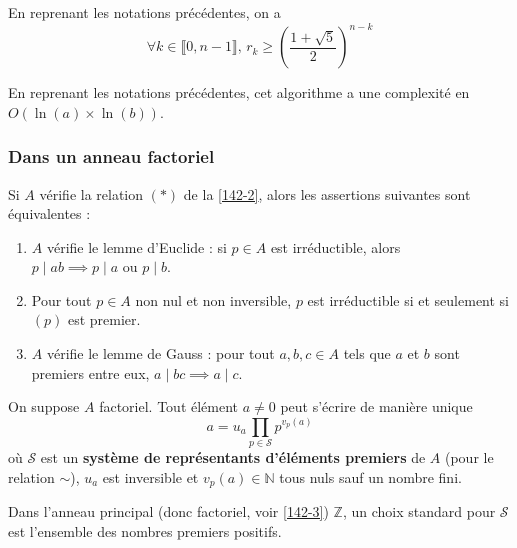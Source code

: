 
  \begin{proposition}
    En reprenant les notations précédentes, on a
    \[ \forall k \in \llbracket 0,n-1 \rrbracket, \, r_k \geq \left( \frac{1+\sqrt{5}}{2} \right)^{n-k} \]
  \end{proposition}

  \begin{corollary}
    En reprenant les notations précédentes, cet algorithme a une complexité en $O(\ln(a) \times \ln(b))$.
  \end{corollary}

  \subsubsection{Dans un anneau factoriel}


  \begin{proposition}
    Si $A$ vérifie la relation $(*)$ de la \cref{142-2}, alors les assertions suivantes sont équivalentes :
    \begin{enumerate}[label={\bfseries(\roman*)}]
      \item $A$ vérifie le lemme d'Euclide : si $p \in A$ est irréductible, alors $p \mid ab \implies p \mid a \text { ou } p \mid b$.
      \item Pour tout $p \in A$ non nul et non inversible, $p$ est irréductible si et seulement si $(p)$ est premier.
      \item $A$ vérifie le lemme de Gauss : pour tout $a, b, c \in A$ tels que $a$ et $b$ sont premiers entre eux, $a \mid bc \implies a \mid c$.
    \end{enumerate}
  \end{proposition}


  \begin{proposition}
    \label{142-2}
    On suppose $A$ factoriel. Tout élément $a \neq 0$ peut s'écrire de manière unique
    \[ a = u_a \prod_{p \in \mathcal{S}} p^{v_p(a)} \tag{$*$} \]
    où $\mathcal{S}$ est un \textbf{système de représentants d'éléments premiers} de $A$ (pour le relation $\sim$), $u_a$ est inversible et $v_p(a) \in \mathbb{N}$ tous nuls sauf un nombre fini.
  \end{proposition}

  \begin{example}
    Dans l'anneau principal (donc factoriel, voir \cref{142-3}) $\mathbb{Z}$, un choix standard pour $\mathcal{S}$ est l'ensemble des nombres premiers positifs.
  \end{example}

